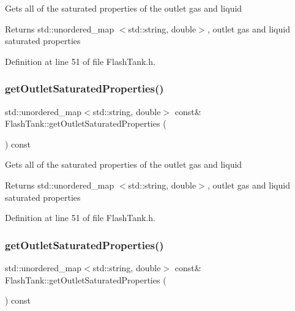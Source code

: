 Gets all of the saturated properties of the outlet gas and liquid \begin{DoxyReturn}{Returns}
std\+::unordered\+\_\+map $<$std\+::string, double$>$, outlet gas and liquid saturated properties 
\end{DoxyReturn}


Definition at line 51 of file Flash\+Tank.\+h.

\mbox{\label{class_flash_tank_aa22fdef56a1ad6d70beda66cc8a6940a}} 
\subsubsection{\texorpdfstring{get\+Outlet\+Saturated\+Properties()}{getOutletSaturatedProperties()}\hspace{0.1cm}{\footnotesize\ttfamily [2/3]}}
{\footnotesize\ttfamily std\+::unordered\+\_\+map$<$std\+::string, double$>$ const\& Flash\+Tank\+::get\+Outlet\+Saturated\+Properties (\begin{DoxyParamCaption}{ }\end{DoxyParamCaption}) const\hspace{0.3cm}{\ttfamily [inline]}}

Gets all of the saturated properties of the outlet gas and liquid \begin{DoxyReturn}{Returns}
std\+::unordered\+\_\+map $<$std\+::string, double$>$, outlet gas and liquid saturated properties 
\end{DoxyReturn}


Definition at line 51 of file Flash\+Tank.\+h.

\mbox{\label{class_flash_tank_aa22fdef56a1ad6d70beda66cc8a6940a}} 
\subsubsection{\texorpdfstring{get\+Outlet\+Saturated\+Properties()}{getOutletSaturatedProperties()}\hspace{0.1cm}{\footnotesize\ttfamily [3/3]}}
{\footnotesize\ttfamily std\+::unordered\+\_\+map$<$std\+::string, double$>$ const\& Flash\+Tank\+::get\+Outlet\+Saturated\+Properties (\begin{DoxyParamCaption}{ }\end{DoxyParamCaption}) const\hspace{0.3cm}{\ttfamily [inline]}}

